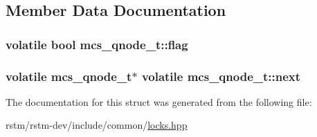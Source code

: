 \subsection{Member Data Documentation}
\hypertarget{structmcs__qnode__t_a0ac75e4cc45a4d99604ec871e50cab99}{
\subsubsection[{flag}]{\setlength{\rightskip}{0pt plus 5cm}volatile bool mcs\-\_\-qnode\-\_\-t\-::flag}}\label{structmcs__qnode__t_a0ac75e4cc45a4d99604ec871e50cab99}
\hypertarget{structmcs__qnode__t_ace1d0e066941d057de4bad5a38fed841}{
\subsubsection[{next}]{\setlength{\rightskip}{0pt plus 5cm}volatile {\bf mcs\-\_\-qnode\-\_\-t}$\ast$ volatile mcs\-\_\-qnode\-\_\-t\-::next}}\label{structmcs__qnode__t_ace1d0e066941d057de4bad5a38fed841}


The documentation for this struct was generated from the following file\-:\begin{DoxyCompactItemize}
\item 
rstm/rstm-\/dev/include/common/\hyperlink{locks_8hpp}{locks.\-hpp}\end{DoxyCompactItemize}
